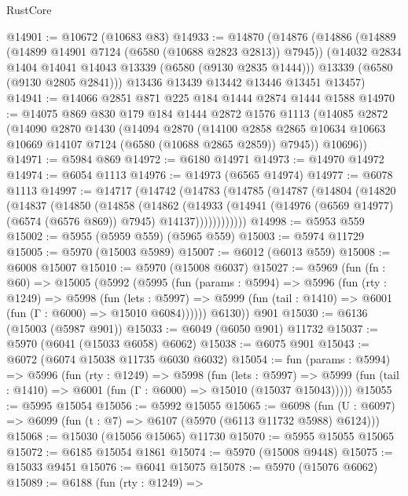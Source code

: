 \begin{lexlean}{RustCore}
\begin{coremodule}
{\begin{coremodule}
{{{{{{{{{{{{{{{{{{{{{{{{{{{{{{{{{{{{{{{{{{{{{@14901 := @10672 (@10683 @83)
@14933 := @14870
    (@14876
      (@14886
        (@14889 (@14899 @14901 @7124 (@6580 (@10688 @2823 @2813)) @7945))
        (@14032 @2834 @1404 @14041 @14043 @13339 (@6580 (@9130 @2835 @1444)))
        @13339
        (@6580 (@9130 @2805 @2841)))
      @13436
      @13439
      @13442
      @13446
      @13451
      @13457)
@14941 := @14066 @2851 @871 @225 @184 @1444 @2874 @1444 @1588
@14970 := @14075
    @869
    @830
    @179
    @184
    @1444
    @2872
    @1576
    @1113
    (@14085
      @2872
      (@14090
        @2870
        @1430
        (@14094
          @2870
          (@14100 @2858 @2865 @10634 @10663 @10669 @14107 @7124 (@6580 (@10688 @2865 @2859)) @7945))
        @10696))
@14971 := @5984 @869
@14972 := @6180 @14971
@14973 := @14970 @14972
@14974 := @6054 @1113
@14976 := @14973 (@6565 @14974)
@14977 := @6078 @1113
@14997 := @14717
    (@14742
      (@14783
        (@14785
          (@14787
            (@14804
              (@14820
                (@14837
                  (@14850
                    (@14858
                      (@14862
                        (@14933
                          (@14941
                            (@14976 (@6569 @14977) (@6574 (@6576 @869)) @7945)
                            @14137))))))))))))
@14998 := @5953 @559
@15002 := @5955 (@5959 @559) (@5965 @559)
@15003 := @5974 @11729
@15005 := @5970 (@15003 @5989)
@15007 := @6012 (@6013 @559)
@15008 := @6008 @15007
@15010 := @5970 (@15008 @6037)
@15027 := @5969
    (fun (fn : @60) =>
    @15005
      (@5992
        (@5995
          (fun (params : @5994) =>
          @5996
            (fun (rty : @1249) =>
            @5998
              (fun (lets : @5997) =>
              @5999 (fun (tail : @1410) => @6001 (fun (Γ : @6000) => @15010 @6084))))))
        @6130))
    @901
@15030 := @6136 (@15003 (@5987 @901))
@15033 := @6049 (@6050 @901) @11732
@15037 := @5970 (@6041 (@15033 @6058) @6062)
@15038 := @6075 @901
@15043 := @6072 (@6074 @15038 @11735 @6030 @6032)
@15054 := fun (params : @5994) =>
  @5996
    (fun (rty : @1249) =>
    @5998
      (fun (lets : @5997) =>
      @5999 (fun (tail : @1410) => @6001 (fun (Γ : @6000) => @15010 (@15037 @15043)))))
@15055 := @5995 @15054
@15056 := @5992 @15055
@15065 := @6098
    (fun (U : @6097) => @6099 (fun (t : @7) => @6107 (@5970 (@6113 @11732 @5988) @6124)))
@15068 := @15030 (@15056 @15065) @11730
@15070 := @5955 @15055 @15065
@15072 := @6185 @15054 @1861
@15074 := @5970 (@15008 @9448)
@15075 := @15033 @9451
@15076 := @6041 @15075
@15078 := @5970 (@15076 @6062)
@15089 := @6188
    (fun (rty : @1249) =>
}}}}}}}}}}}}}}}}}}}}}}}}}}}}}}}}}}}}}}}}}}}}}
\end{coremodule}}
\end{coremodule}
\end{lexlean}
